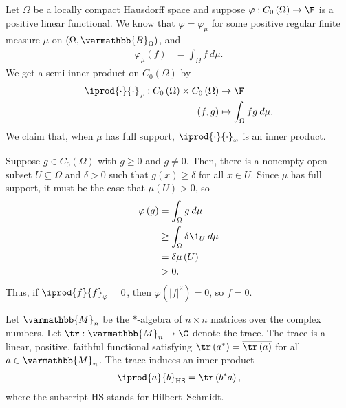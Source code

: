 \documentclass[10pt]{mypackage}
\renewcommand*{\mathbb}[1]{\varmathbb{#1}}
\newcommand{\B}{\mathbb{B}}
\begin{document}
\begin{example}
  Let $\Omega$ be a locally compact Hausdorff space and suppose $\varphi: C_0\left(\Omega\right)\rightarrow \F$ is a positive linear functional. We know that $\varphi = \varphi_{\mu}$ for some positive regular finite measure $\mu$ on $\left(\Omega,\B_{\Omega}\right)$, and
  \begin{align*}
    \varphi_{\mu}\left(f\right) &= \int_{\Omega}^{} f\:d\mu.
  \end{align*}
  We get a semi inner product on $C_{0}\left(\Omega\right)$ by
  \begin{align*}
    \iprod{\cdot}{\cdot}_{\varphi}: C_0\left(\Omega\right)\times C_0\left(\Omega\right) &\rightarrow \F\\
    \left(f,g\right) &\mapsto \int_{\Omega}^{} f\overline{g}\:d\mu.
  \end{align*}
  We claim that, when $\mu$ has full support, $ \iprod{\cdot}{\cdot}_{\varphi} $ is an inner product.\newline

  Suppose $g\in C_0\left(\Omega\right)$ with $g\geq 0$ and $g \neq 0$. Then, there is a nonempty open subset $U\subseteq \Omega$ and $\delta > 0$ such that $g(x) \geq \delta$ for all $x\in U$. Since $\mu$ has full support, it must be the case that $\mu\left(U\right) > 0$, so
  \begin{align*}
    \varphi\left(g\right) &= \int_{\Omega}^{} g\:d\mu\\
                          &\geq \int_{\Omega}^{} \delta \1_{U}\:d\mu\\
                          &= \delta \mu\left(U\right)\\
                          &> 0.
  \end{align*}
  Thus, if $ \iprod{f}{f}_{\varphi} = 0 $, then $\varphi\left(\left\vert f \right\vert^2\right) = 0$, so $f = 0$.
\end{example}
\begin{example}
  Let $\mathbb{M}_{n}$ be the $\ast$-algebra of $n\times n$ matrices over the complex numbers. Let $\tr: \mathbb{M}_{n}\rightarrow \C$ denote the trace. The trace is a linear, positive, faithful functional satisfying $\tr\left(a^{\ast}\right) = \overline{\tr\left(a\right)}$ for all $a\in \mathbb{M}_{n}$. The trace induces an inner product
  \begin{align*}
    \iprod{a}{b}_{\text{HS}} = \tr\left(b^{\ast}a\right),
  \end{align*}
  where the subscript HS stands for Hilbert--Schmidt.
\end{example}
\end{document}
